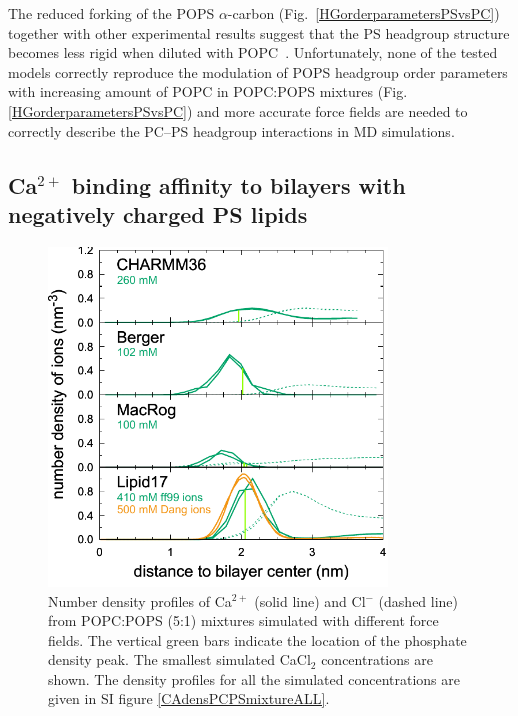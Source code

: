 \documentclass[aps,prl,superscriptaddress,twocolumn]{revtex4}
\begin{document}
The reduced forking of the POPS $\alpha$-carbon (Fig.~\ref{HGorderparametersPSvsPC})
together with other experimental results suggest that the PS headgroup structure becomes less rigid when diluted with
POPC~\cite{browning80,buldt81,roux90,roux91,scherer87}.
Unfortunately, none of the tested models correctly reproduce the modulation of POPS headgroup order
parameters with increasing amount of POPC in POPC:POPS mixtures (Fig. \ref{HGorderparametersPSvsPC})
and more accurate force fields are needed
to correctly describe the PC--PS headgroup interactions in MD simulations.

\subsection{Ca$^{2+}$ binding affinity to bilayers with negatively charged PS lipids}
\begin{figure}[tb]
  \centering
  \includegraphics[width=9cm]{../Figs/CAdensPCPSmixtureLOWconsformatted.pdf}
  \caption{\label{CAdensPCPSmixture}
    Number density profiles of Ca$^{2+}$ (solid line) and Cl$^-$ (dashed line) from POPC:POPS (5:1) mixtures
    simulated with different force fields. The vertical green bars indicate the location of the phosphate density peak.
    The smallest simulated CaCl$_2$ concentrations are shown.
    The density profiles for all the simulated concentrations are given in SI figure \ref{CAdensPCPSmixtureALL}.
  }
\end{figure}
\end{document}
